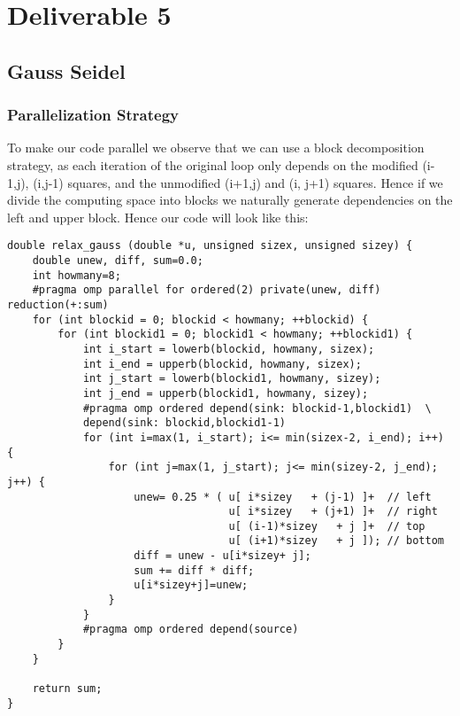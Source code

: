 \documentclass[11pt]{article}
\date{\today}
\title{}
\begin{document}
\tableofcontents

\section{Deliverable 5}
\label{sec:org07ad45b}
\subsection{Gauss Seidel}
\label{sec:org11284ee}
\subsubsection{Parallelization Strategy}
\label{sec:orgd3409a5}
To make our code parallel we observe that we can use a block decomposition strategy, as each iteration of the original loop only depends on the modified (i-1,j), (i,j-1) squares, and the unmodified (i+1,j) and (i, j+1) squares. Hence if we divide the computing space into blocks we naturally generate dependencies on the left and upper block. Hence our code will look like this:

\begin{verbatim}
double relax_gauss (double *u, unsigned sizex, unsigned sizey) {
    double unew, diff, sum=0.0;
    int howmany=8;
    #pragma omp parallel for ordered(2) private(unew, diff) reduction(+:sum)
    for (int blockid = 0; blockid < howmany; ++blockid) {
        for (int blockid1 = 0; blockid1 < howmany; ++blockid1) {
            int i_start = lowerb(blockid, howmany, sizex);
            int i_end = upperb(blockid, howmany, sizex);
            int j_start = lowerb(blockid1, howmany, sizey);
            int j_end = upperb(blockid1, howmany, sizey);
            #pragma omp ordered depend(sink: blockid-1,blockid1)  \
            depend(sink: blockid,blockid1-1)
            for (int i=max(1, i_start); i<= min(sizex-2, i_end); i++) {
                for (int j=max(1, j_start); j<= min(sizey-2, j_end); j++) {
                    unew= 0.25 * ( u[ i*sizey	+ (j-1) ]+  // left
                                   u[ i*sizey	+ (j+1) ]+  // right
                                   u[ (i-1)*sizey	+ j ]+  // top
                                   u[ (i+1)*sizey	+ j ]); // bottom
                    diff = unew - u[i*sizey+ j];
                    sum += diff * diff;
                    u[i*sizey+j]=unew;
                }
            }
            #pragma omp ordered depend(source)
        }
    }

    return sum;
}
\end{verbatim}
\end{document}
